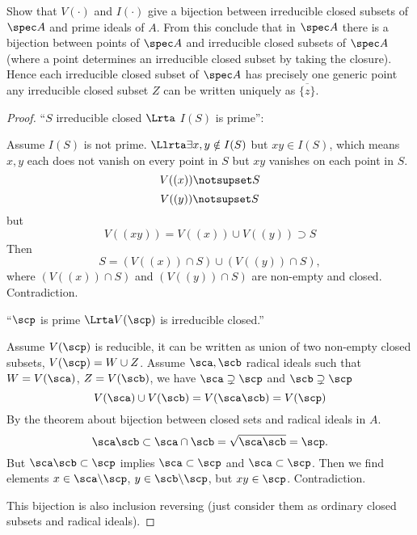 \begin{exr}\label{chap3exr:bijection_closed_subsets_points_affine}
Show that $V(\cdot)$ and $I(\cdot)$ give a bijection between irreducible closed subsets of $\spec A$ and prime ideals of $A$. From this conclude that in $\spec A$ there is a bijection between points of $\spec A$ and irreducible closed subsets of $\spec A$ (where a point determines an irreducible closed subset by taking the closure). Hence each irreducible closed subset of $\spec A$ has precisely one generic point  any irreducible closed subset $Z$ can be written uniquely as $\overline{\{z\}}$.
\end{exr}
\begin{proof}
``$S$ irreducible closed $\Lrta$ $I(S)$ is prime'':

Assume $I(S)$ is not prime. $\Llrta \exists x,y\notin I(S)$ but $xy\in I(S)$, which means $x,y$ each does not vanish on every point in $S$ but $xy$ vanishes on each point in $S$.
$$
V((x))\notsupset S
$$
$$
V((y))\notsupset S
$$
but 
$$
V((xy))=V((x))\cup V((y))\supset S
$$
Then 
$$
S=(V((x))\cap S)\cup (V((y))\cap S),
$$
where $(V((x))\cap S)$ and $ (V((y))\cap S)$ are non-empty and closed. Contradiction.


``$\scp$ is prime $\Lrta V(\scp)$ is irreducible closed.''

Assume $V(\scp)$ is reducible, it can be written as union of two non-empty closed subsets, $V(\scp)=W\cup Z$. Assume $\sca,\scb$ radical ideals such that $W=V(\sca)$, $Z=V(\scb)$, we have $\sca\supsetneq \scp$ and $\scb\supsetneq \scp$
$$
V(\sca)\cup V(\scb)=V(\sca\scb)=V(\scp)
$$
By the theorem about bijection between closed sets and radical ideals in $A$.
$$
\sca\scb\subset\sca\cap\scb=\sqrt{\sca\scb}=\scp.
$$
But $\sca\scb\subset \scp$ implies $\sca\subset \scp$ and $\sca\subset\scp$. Then we find elements $x\in \sca\backslash\scp$, $y\in \scb\backslash\scp$, but $xy\in\scp$. Contradiction.


This bijection is also inclusion reversing (just consider them as ordinary closed subsets and radical ideals).


\end{proof}


